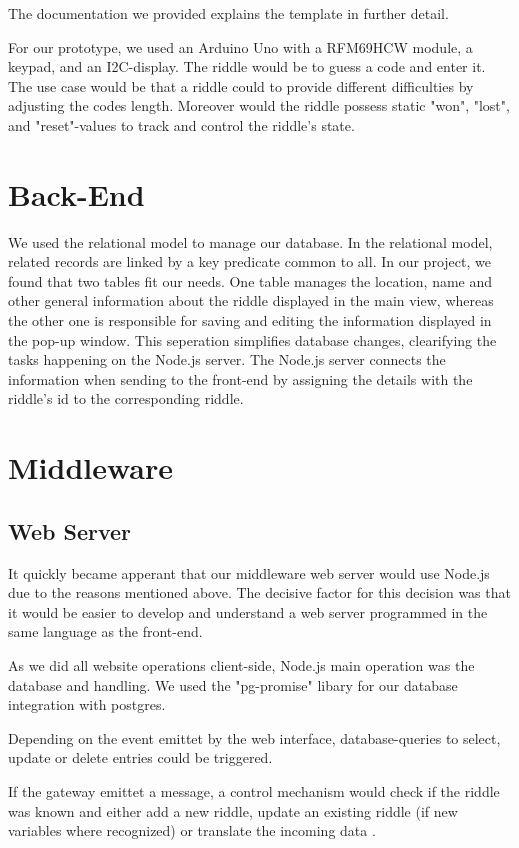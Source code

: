 The documentation we provided explains the template in further detail.

For our prototype, we used an Arduino Uno with a RFM69HCW module, a keypad, and an I2C-display. 
The riddle would be to guess a code and enter it. 
The use case would be that a riddle could to provide different difficulties by adjusting the codes length. 
Moreover would the riddle possess static  "won", "lost", and "reset"-values to track and control the riddle's state.
\section{Back-End}
We used the relational model to manage our database. 
In the relational model, related records are linked by a key predicate common to all. 
In our project, we found that two tables fit our needs. 
One table manages the location, name and other general information about the riddle displayed in the main view, 
whereas the other one is responsible for saving and editing the information displayed in the pop-up window. 
This seperation simplifies database changes, clearifying the tasks happening on the Node.js server.
The Node.js server connects the information when sending to the front-end by assigning the details with the riddle's id to the corresponding riddle. 

\section{Middleware}

\subsection{Web Server}
It quickly became apperant that our middleware web server would use Node.js due to the reasons mentioned above.
The decisive factor for this decision was that it would be easier to develop and understand a web server programmed in the same language as the front-end.

As we did all website operations client-side, Node.js main operation was the database and handling. 
We used the "pg-promise" libary \parencite{pg-promise} for our database integration with postgres. 

Depending on the event emittet by the web interface, database-queries to select, update or delete entries could be triggered.

If the gateway emittet a message, a control mechanism would check if the riddle was known and either add a new riddle, update an existing riddle (if new variables where recognized) or translate the incoming data .

